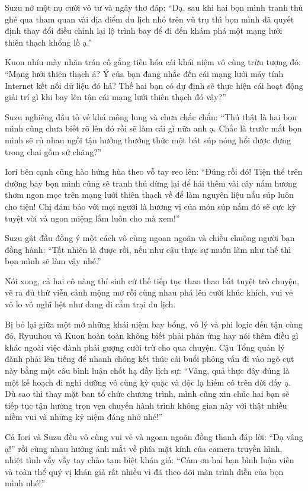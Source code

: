 \documentclass[../main.tex]{subfiles}
\begin{document}
Suzu nở một nụ cười vô tư và ngây thơ đáp: ``Dạ, sau khi hai bọn mình tranh thủ ghé qua tham quan vài địa điểm du lịch nhỏ trên vũ trụ thì bọn mình đã quyết định thay đổi điều chỉnh lại lộ trình bay để đi đến khám phá một mạng lưới thiên thạch khổng lồ ạ.''

Kuon nhíu mày nhăn trán cố gắng tiêu hóa cái khái niệm vô cùng trừu tượng đó: ``Mạng lưới thiên thạch á? Ý của bạn đang nhắc đến cái mạng lưới máy tính Internet kết nối dữ liệu đó hả? Thế hai bạn có dự định sẽ thực hiện cái hoạt động giải trí gì khi bay lên tận cái mạng lưới thiên thạch đó vậy?''

Suzu nghiêng đầu tỏ vẻ khá mông lung và chưa chắc chắn: ``Thú thật là hai bọn mình cũng chưa biết rõ lên đó rồi sẽ làm cái gì nữa anh ạ. Chắc là trước mắt bọn mình sẽ rủ nhau ngồi tận hưởng thưởng thức một bát súp nóng hổi được đựng trong chai gốm sứ chăng?''

Iori bên cạnh cũng hào hứng hùa theo vỗ tay reo lên: ``Đúng rồi đó! Tiện thể trên đường bay bọn mình cũng sẽ tranh thủ dừng lại để hái thêm vài cây nấm hương thơm ngon mọc trên mạng lưới thiên thạch về để làm nguyên liệu nấu súp luôn cho tiện! Chị đảm bảo với mọi người là hương vị của món súp nấm đó sẽ cực kỳ tuyệt vời và ngon miệng lắm luôn cho mà xem!''

Suzu gật đầu đồng ý một cách vô cùng ngoan ngoãn và chiều chuộng người bạn đồng hành: ``Tất nhiên là được rồi, nếu như cậu thực sự muốn làm như thế thì bọn mình sẽ làm vậy nhé.''

Nói xong, cả hai cô nàng thí sinh cứ thế tiếp tục thao thao bất tuyệt trò chuyện, vẽ ra đủ thứ viễn cảnh mộng mơ rồi cùng nhau phá lên cười khúc khích, vui vẻ vô lo vô nghĩ hệt như đang đi cắm trại du lịch.

Bị bỏ lại giữa một mớ những khái niệm bay bổng, vô lý và phi logic đến tận cùng đó, Ryuuhou và Kuon hoàn toàn không biết phải phản ứng hay nói thêm điều gì khác ngoài việc đành phải gượng cười trừ cho qua chuyện. Cậu Tổng quản lý đành phải lên tiếng để nhanh chóng kết thúc cái buổi phỏng vấn đi vào ngõ cụt này bằng một câu bình luận chốt hạ đầy lịch sự: ``Vâng, quả thực đây đúng là một kế hoạch đi nghỉ dưỡng vô cùng kỳ quặc và độc lạ hiếm có trên đời đấy ạ. Dù sao thì thay mặt ban tổ chức chương trình, mình cũng xin chúc hai bạn sẽ tiếp tục tận hưởng trọn vẹn chuyến hành trình không gian này với thật nhiều niềm vui và những kỷ niệm đáng nhớ nhé!''

Cả Iori và Suzu đều vô cùng vui vẻ và ngoan ngoãn đồng thanh đáp lời: ``Dạ vâng ạ!'' rồi cùng nhau hướng ánh mắt về phía mặt kính của camera truyền hình, nhiệt tình vẫy vẫy tay chào tạm biệt khán giả: ``Cảm ơn hai bạn bình luận viên và toàn thể quý vị khán giả rất nhiều vì đã theo dõi màn trình diễn của bọn mình nhé!''
\end{document}
